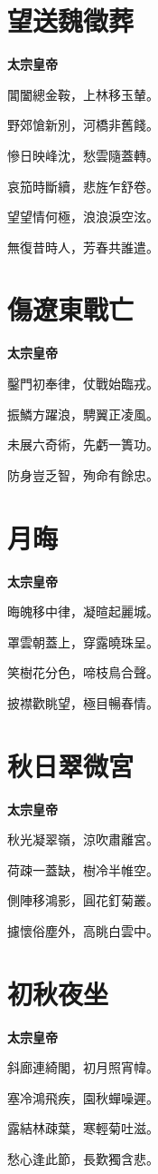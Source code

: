 \documentclass[12pt,a4paper]{ctexbook}
\begin{document}
\section{望送魏徵葬}
\textbf{太宗皇帝}\par\vspace{0.5em}
閶闔總金鞍，上林移玉輦。\par
野郊愴新別，河橋非舊餞。\par
慘日映峰沈，愁雲隨蓋轉。\par
哀笳時斷續，悲旌乍舒卷。\par
望望情何極，浪浪淚空泫。\par
無復昔時人，芳春共誰遣。\par

\section{傷遼東戰亡}
\textbf{太宗皇帝}\par\vspace{0.5em}
鑿門初奉律，仗戰始臨戎。\par
振鱗方躍浪，騁翼正凌風。\par
未展六奇術，先虧一簣功。\par
防身豈乏智，殉命有餘忠。\par

\section{月晦}
\textbf{太宗皇帝}\par\vspace{0.5em}
晦魄移中律，凝暄起麗城。\par
罩雲朝蓋上，穿露曉珠呈。\par
笑樹花分色，啼枝鳥合聲。\par
披襟歡眺望，極目暢春情。\par

\section{秋日翠微宮}
\textbf{太宗皇帝}\par\vspace{0.5em}
秋光凝翠嶺，涼吹肅離宮。\par
荷疎一蓋缺，樹冷半帷空。\par
側陣移鴻影，圓花釘菊叢。\par
攄懷俗塵外，高眺白雲中。\par

\section{初秋夜坐}
\textbf{太宗皇帝}\par\vspace{0.5em}
斜廊連綺閣，初月照宵幃。\par
塞冷鴻飛疾，園秋蟬噪遲。\par
露結林疎葉，寒輕菊吐滋。\par
愁心逢此節，長歎獨含悲。\par
\end{document}
